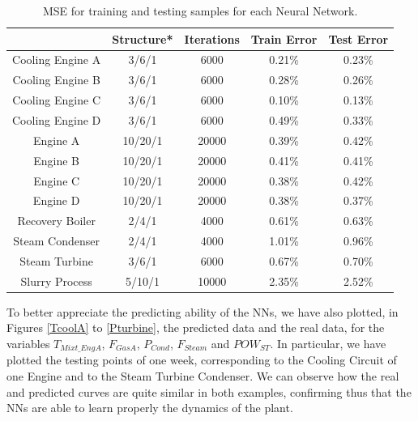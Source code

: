 \begin{table}[!t]
\label{tbl:mse}
  \centering
\caption{MSE for training and testing samples for each Neural Network.}
\label{MSE} %
\begin{tabular}{|c|c|c|c|c|}
  \hline
 & Structure* & Iterations & Train Error & Test Error \\
 \hline
Cooling Engine A & 3/6/1 & 6000 & 0.21\% & 0.23\% \\
 \hline
Cooling Engine B & 3/6/1 & 6000 & 0.28\% & 0.26\% \\
 \hline
Cooling Engine C & 3/6/1 & 6000 & 0.10\% & 0.13\% \\
 \hline
Cooling Engine D & 3/6/1 & 6000 & 0.49\% & 0.33\% \\
 \hline
 Engine A & 10/20/1 & 20000 & 0.39\% & 0.42\% \\
 \hline
 Engine B & 10/20/1 & 20000 & 0.41\% & 0.41\% \\
 \hline
 Engine C & 10/20/1 & 20000 & 0.38\% & 0.42\% \\
 \hline
 Engine D & 10/20/1 & 20000 & 0.38\% & 0.37\% \\
 \hline
 Recovery Boiler & 2/4/1 & 4000 & 0.61\% & 0.63\% \\
 \hline
 Steam Condenser & 2/4/1 & 4000 & 1.01\% & 0.96\% \\
 \hline
 Steam Turbine & 3/6/1 & 6000 & 0.67\% & 0.70\% \\
 \hline
 Slurry Process & 5/10/1 & 10000 & 2.35\% & 2.52\% \\
 \hline
\end{tabular}
\vspace{-0.3cm}

\end{table}


To better appreciate the predicting ability of the NNs, we have also plotted, in Figures \ref{TcoolA} to  \ref{Pturbine}, the predicted data and the real data, for the variables $T_{Mixt\_EngA}$, $F_{GasA}$, $P_{Cond}$, $F_{Steam}$ and $POW_{ST}$. In particular, we have plotted the testing points of one week, corresponding to the Cooling Circuit of one Engine and to the Steam Turbine Condenser. We can observe how the  real and predicted curves are quite similar in both examples, confirming thus that the NNs are able to learn properly the dynamics of the plant. 


